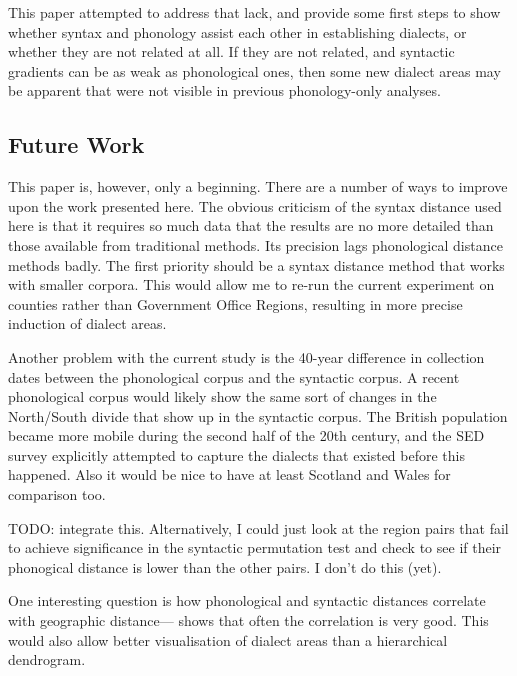 \documentclass[11pt]{article}
\begin{document}
This paper attempted to address that lack, and provide some first steps
to show whether syntax and phonology assist each other in establishing
dialects, or whether they are not related at all. If they are not
related, and syntactic gradients can be as weak as phonological ones,
then some new dialect areas may be apparent that were not visible in
previous phonology-only analyses.

\subsection{Future Work}

This paper is, however, only a beginning. There are a number of ways to
improve upon the work presented here. The obvious criticism of the
syntax distance used here is that it requires so much data that the
results are no more detailed than those available from traditional
methods. Its precision lags phonological distance methods badly. The
first priority should be a syntax distance method that works with
smaller corpora. This would allow me to re-run the current experiment
on counties rather than Government Office Regions, resulting in more
precise induction of dialect areas.

Another problem with the current study is the 40-year difference in
collection dates between the phonological corpus and the syntactic
corpus. A recent phonological corpus would likely show the same sort
of changes in the North/South divide that show up in the syntactic
corpus. The British population became more mobile during the second
half of the 20th century, and the SED survey explicitly attempted to capture
the dialects that existed before this happened. Also it would be nice to have at
least Scotland and Wales for comparison too.

TODO: integrate this.
Alternatively, I could just look at the region pairs that fail to
achieve significance in the syntactic permutation test and check to
see if their phonogical distance is lower than the other pairs. I
don't do this (yet).

One interesting question is
how phonological and syntactic distances correlate with geographic
distance--- shows that often the correlation is
very good. This would also allow better visualisation of dialect areas
than a hierarchical dendrogram.


\end{document}
